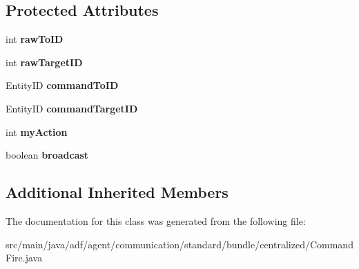 \subsection*{Protected Attributes}
\begin{DoxyCompactItemize}
\item 
\hypertarget{classadf_1_1agent_1_1communication_1_1standard_1_1bundle_1_1centralized_1_1CommandFire_a82bdd775417bd34a66cdd3ef2f4b6704}{}\label{classadf_1_1agent_1_1communication_1_1standard_1_1bundle_1_1centralized_1_1CommandFire_a82bdd775417bd34a66cdd3ef2f4b6704} 
int {\bfseries raw\+To\+ID}
\item 
\hypertarget{classadf_1_1agent_1_1communication_1_1standard_1_1bundle_1_1centralized_1_1CommandFire_a6f8e1ba3f4e07e275d5a8f1d613d1045}{}\label{classadf_1_1agent_1_1communication_1_1standard_1_1bundle_1_1centralized_1_1CommandFire_a6f8e1ba3f4e07e275d5a8f1d613d1045} 
int {\bfseries raw\+Target\+ID}
\item 
\hypertarget{classadf_1_1agent_1_1communication_1_1standard_1_1bundle_1_1centralized_1_1CommandFire_aaf4e5df81e6cb8aa3ea3b7ba48b3a251}{}\label{classadf_1_1agent_1_1communication_1_1standard_1_1bundle_1_1centralized_1_1CommandFire_aaf4e5df81e6cb8aa3ea3b7ba48b3a251} 
Entity\+ID {\bfseries command\+To\+ID}
\item 
\hypertarget{classadf_1_1agent_1_1communication_1_1standard_1_1bundle_1_1centralized_1_1CommandFire_ae5fce8493a2500b29c7187f495651097}{}\label{classadf_1_1agent_1_1communication_1_1standard_1_1bundle_1_1centralized_1_1CommandFire_ae5fce8493a2500b29c7187f495651097} 
Entity\+ID {\bfseries command\+Target\+ID}
\item 
\hypertarget{classadf_1_1agent_1_1communication_1_1standard_1_1bundle_1_1centralized_1_1CommandFire_a85cbeb2b045c7124c95a2233b67be181}{}\label{classadf_1_1agent_1_1communication_1_1standard_1_1bundle_1_1centralized_1_1CommandFire_a85cbeb2b045c7124c95a2233b67be181} 
int {\bfseries my\+Action}
\item 
\hypertarget{classadf_1_1agent_1_1communication_1_1standard_1_1bundle_1_1centralized_1_1CommandFire_a0bae03d4763b5725247eb7a1dd1a49b0}{}\label{classadf_1_1agent_1_1communication_1_1standard_1_1bundle_1_1centralized_1_1CommandFire_a0bae03d4763b5725247eb7a1dd1a49b0} 
boolean {\bfseries broadcast}
\end{DoxyCompactItemize}
\subsection*{Additional Inherited Members}


The documentation for this class was generated from the following file\+:\begin{DoxyCompactItemize}
\item 
src/main/java/adf/agent/communication/standard/bundle/centralized/Command\+Fire.\+java\end{DoxyCompactItemize}
